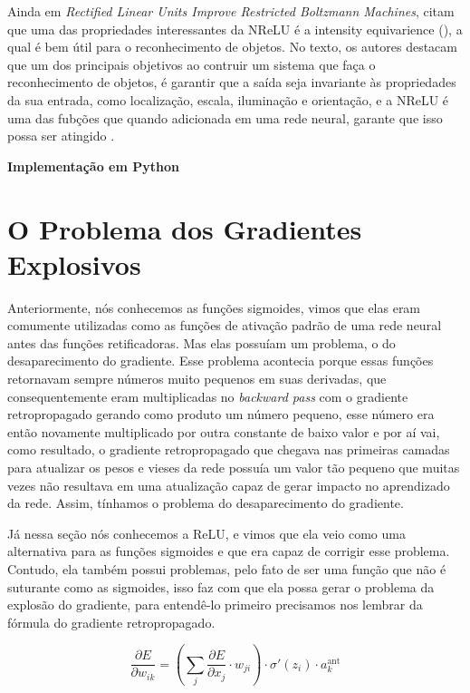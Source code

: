 Ainda em \textit{Rectified Linear Units Improve Restricted Boltzmann Machines}, \textcite{Nair2010} citam que uma das propriedades interessantes da NReLU é a intensity equivarience (), a qual é bem útil para o reconhecimento de objetos. No texto, os autores destacam que um dos principais objetivos ao contruir um sistema que faça o reconhecimento de objetos, é garantir que a saída seja invariante às propriedades da sua entrada, como localização, escala, iluminação e orientação, e a NReLU é uma das fubções que quando adicionada em uma rede neural, garante que isso possa ser atingido \parencite{Nair2010}.

\textbf{Implementação em Python}

\section{O Problema dos Gradientes Explosivos}

Anteriormente, nós conhecemos as funções sigmoides, vimos que elas eram comumente utilizadas como as funções de ativação padrão de uma rede neural antes das funções retificadoras. Mas elas possuíam um problema, o do desaparecimento do gradiente. Esse problema acontecia porque essas funções retornavam sempre números muito pequenos em suas derivadas, que consequentemente eram multiplicadas no \textit{backward pass} com o gradiente retropropagado gerando como produto um número pequeno, esse número era então novamente multiplicado por outra constante de baixo valor e por aí vai, como resultado, o gradiente retropropagado que chegava nas primeiras camadas para atualizar os pesos e vieses da rede possuía um valor tão pequeno que muitas vezes não resultava em uma atualização capaz de gerar impacto no aprendizado da rede. Assim, tínhamos o problema do desaparecimento do gradiente.

Já nessa seção nós conhecemos a ReLU, e vimos que ela veio como uma alternativa para as funções sigmoides e que era capaz de corrigir esse problema. Contudo, ela também possui problemas, pelo fato de ser uma função que não é suturante como as sigmoides, isso faz com que ela possa gerar o problema da explosão do gradiente, para entendê-lo primeiro precisamos nos lembrar da fórmula do gradiente retropropagado.

\[
        \frac{\partial E}{\partial w_{ik}} = 
            \left( \sum_j \frac{\partial E}{\partial x_j} \cdot w_{ji} \right)
        \cdot 
            \sigma'(z_i)
        \cdot 
            a_k^{\text{ant}}
\]

